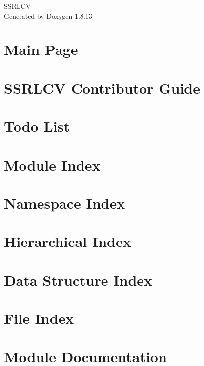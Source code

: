 \documentclass[twoside]{book}
\newcommand{\+}{\discretionary{\mbox{\scriptsize$\hookleftarrow$}}{}{}}
\newcommand{\clearemptydoublepage}{%
  \newpage{\pagestyle{empty}\cleardoublepage}%
}
\begin{document}
\hypersetup{pageanchor=false,
             bookmarksnumbered=true,
             pdfencoding=unicode
            }
\begin{titlepage}
\vspace*{7cm}
\begin{center}%
{\Large S\+S\+R\+L\+CV }\\
\vspace*{1cm}
{\large Generated by Doxygen 1.8.13}\\
\end{center}
\end{titlepage}
\clearemptydoublepage
{}
\tableofcontents
\clearemptydoublepage
{}
\hypersetup{pageanchor=true}

\chapter{Main Page}
\label{index}\hypertarget{index}{}
\chapter{S\+S\+R\+L\+CV Contributor Guide}
\label{md_CONTRIB}

\chapter{Todo List}
\label{todo}

\chapter{Module Index}

\chapter{Namespace Index}

\chapter{Hierarchical Index}

\chapter{Data Structure Index}

\chapter{File Index}

\chapter{Module Documentation}




















\end{document}
